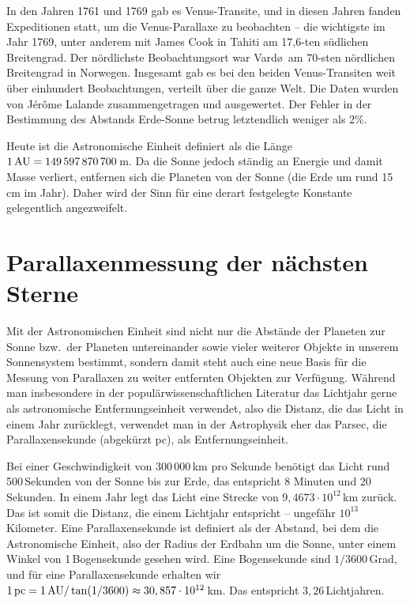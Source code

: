 In den Jahren 1761 und 1769 gab es Venus-Transite, und in diesen Jahren fanden Expeditionen
statt, um die Venus-Parallaxe zu beobachten -- die wichtigste im Jahr 1769, unter anderem mit James
Cook in Tahiti am 17,6-ten s\"udlichen Breitengrad. Der n\"ordlichste 
Beobachtungsort war Vard\o\ am 70-sten n\"ordlichen Breitengrad in Norwegen. Insgesamt gab es bei
den beiden Venus-Transiten weit \"uber einhundert Beobachtungen, verteilt \"uber die ganze Welt. 
Die Daten wurden von 
J\'{e}r\^{o}me Lalande zusammengetragen und ausgewertet. Der Fehler in der
Bestimmung des Abstands Erde-Sonne betrug letztendlich weniger als 2\%. 

Heute ist die Astronomische Einheit definiert als die 
L\"ange $1\,{\rm AU}=149\,597\,870\,700$\,m. 
Da die Sonne jedoch st\"andig an Energie und damit Masse verliert, entfernen sich die Planeten
von der Sonne (die Erde um rund 15\,cm im Jahr). Daher wird der Sinn f\"ur eine derart festgelegte
Konstante gelegentlich angezweifelt. 

\section{Parallaxenmessung der n\"achsten Sterne}

Mit der Astronomischen Einheit sind nicht nur die Abst\"ande der Planeten zur Sonne bzw.\ der
Planeten untereinander sowie vieler weiterer Objekte in unserem Sonnensystem bestimmt, sondern damit
steht auch eine neue Basis f\"ur die Messung von Parallaxen zu weiter entfernten Objekten zur
Verf\"ugung. W\"ahrend man insbesondere in der popul\"arwissenschaftlichen Literatur das Lichtjahr 
gerne als astronomische Entfernungseinheit verwendet, also
die Distanz, die das Licht in einem Jahr zur\"ucklegt, verwendet man in der Astrophysik eher
das Parsec, die Parallaxensekunde (abgek\"urzt pc), als Entfernungseinheit. 

Bei einer Geschwindigkeit von 300\,000\,km pro Sekunde ben\"otigt das Licht rund 500\,Sekunden
von der Sonne bis zur Erde, das entspricht 8 Minuten und 20 Sekunden. In einem Jahr legt das
Licht eine Strecke von $9,4673\cdot 10^{12}$\,km zur\"uck. Das ist somit die Distanz, die einem 
Lichtjahr entspricht -- ungef\"ahr $10^{13}$ Kilometer. 
Eine Parallaxensekunde ist definiert als
der Abstand, bei dem die Astronomische Einheit, also der Radius der Erdbahn um die Sonne, 
unter einem Winkel von 1\,Bogensekunde gesehen wird. Eine Bogensekunde sind $1/3600$\,Grad,
und f\"ur eine Parallaxensekunde erhalten wir 
$1\,{\rm pc}=1\,{\rm AU}/\tan (1/3600) \approx 30,857\cdot 10^{12}$\,km. 
Das entspricht $3,26$\,Lichtjahren.   

